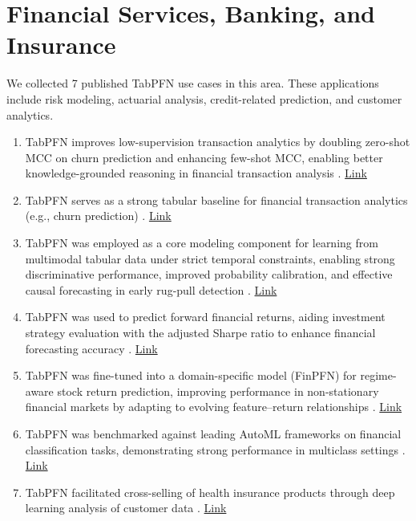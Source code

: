 \section*{Financial Services, Banking, and Insurance}

We collected 7 published TabPFN use cases in this area. These applications include risk modeling, actuarial analysis, credit-related prediction, and customer analytics.

\begin{enumerate}

\item TabPFN improves low-supervision transaction analytics by doubling zero-shot MCC on churn prediction and enhancing few-shot MCC, enabling better knowledge-grounded reasoning in financial transaction analysis \cite{sakhno2026financial}. \href{http://arxiv.org/abs/2603.15459}{Link}

\item TabPFN serves as a strong tabular baseline for financial transaction analytics (e.g., churn prediction) \cite{li2025classimbalancedaware}. \href{http://arxiv.org/abs/2501.10677v2}{Link}

\item TabPFN was employed as a core modeling component for learning from multimodal tabular data under strict temporal constraints, enabling strong discriminative performance, improved probability calibration, and effective causal forecasting in early rug-pull detection \cite{shoaei2026lroo}. \href{http://arxiv.org/abs/2603.11324v1}{Link}

\item TabPFN was used to predict forward financial returns, aiding investment strategy evaluation with the adjusted Sharpe ratio to enhance financial forecasting accuracy \cite{githubGitHubZx20030501sp500marketpredictiontabpfn}. \href{https://github.com/zx20030501/sp500-market-prediction-tabpfn}{Link}

\item TabPFN was fine-tuned into a domain-specific model (FinPFN) for regime-aware stock return prediction, improving performance in non-stationary financial markets by adapting to evolving feature--return relationships \cite{wang2025metalearning}. \href{https://www.sciencedirect.com/science/article/abs/pii/S1386418125000825}{Link}

\item TabPFN was benchmarked against leading AutoML frameworks on financial classification tasks, demonstrating strong performance in multiclass settings \cite{leyh2025automlfinance}.  \href{https://aisel.aisnet.org/acis2025/28/}{Link}


\item TabPFN facilitated cross-selling of health insurance products through deep learning analysis of customer data \cite{fin_usecase2_crosssell_health_insurance}. \href{https://ieeexplore.ieee.org/abstract/document/10475046}{Link}

\end{enumerate}

